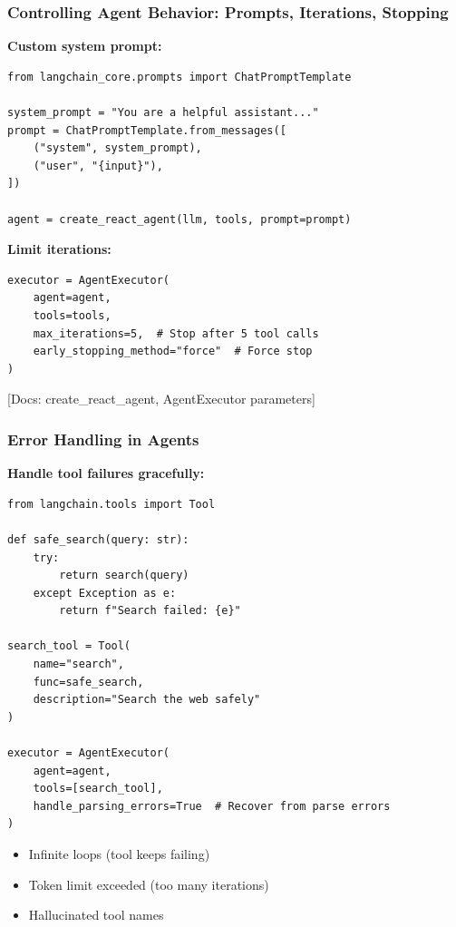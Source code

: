 \documentclass[aspectratio=169,11pt]{beamer}
\newcommand{\docref}[1]{{\scriptsize\color{docgray}[Docs: #1]}}
\begin{document}
\begin{frame}[fragile]
\frametitle{Controlling Agent Behavior: Prompts, Iterations, Stopping}

\textbf{Custom system prompt:}

\begin{lstlisting}
from langchain_core.prompts import ChatPromptTemplate

system_prompt = "You are a helpful assistant..."
prompt = ChatPromptTemplate.from_messages([
    ("system", system_prompt),
    ("user", "{input}"),
])

agent = create_react_agent(llm, tools, prompt=prompt)
\end{lstlisting}

\textbf{Limit iterations:}

\begin{lstlisting}
executor = AgentExecutor(
    agent=agent,
    tools=tools,
    max_iterations=5,  # Stop after 5 tool calls
    early_stopping_method="force"  # Force stop
)
\end{lstlisting}

\docref{create\_react\_agent, AgentExecutor parameters}

\end{frame}

\begin{frame}[fragile]
\frametitle{Error Handling in Agents}

\textbf{Handle tool failures gracefully:}

\begin{lstlisting}
from langchain.tools import Tool

def safe_search(query: str):
    try:
        return search(query)
    except Exception as e:
        return f"Search failed: {e}"

search_tool = Tool(
    name="search",
    func=safe_search,
    description="Search the web safely"
)

executor = AgentExecutor(
    agent=agent,
    tools=[search_tool],
    handle_parsing_errors=True  # Recover from parse errors
)
\end{lstlisting}

\begin{warningbox}
\begin{itemize}
  \item Infinite loops (tool keeps failing)
  \item Token limit exceeded (too many iterations)
  \item Hallucinated tool names
\end{itemize}
\end{warningbox}

\end{frame}
\end{document}
